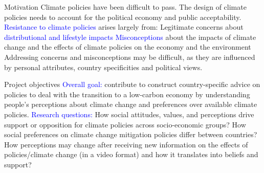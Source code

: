 








\begin{frame}{Motivation}
\bbs
\ip Climate policies have been difficult to pass.
\ip The design of climate policies needs to account for the political economy and public acceptability.
\ip \textcolor{blue}{Resistance to climate policies} arises largely from:
\bbs
\ip Legitimate concerns about \textcolor{blue}{distributional and lifestyle impacts}
\ip \textcolor{blue}{Misconceptions} about the impacts of climate change and the effects of climate policies on the economy and the environment
\ee 
\ip Addressing concerns and misconceptions may be difficult, as they are influenced by personal attributes, country specificities and political views.
\ee
\end{frame}

\begin{frame}{Project objectives}
\bbs
\ip \textcolor{blue}{Overall goal:} contribute to construct country-specific advice on policies to deal with the transition to a low-carbon economy by understanding people’s perceptions about climate change and preferences over available climate policies.
\ip \textcolor{blue}{Research questions:}
\bbs
\ip How social attitudes, values, and perceptions drive support or opposition for climate policies across socio-economic groups?
\ip How social preferences on climate change mitigation policies differ between countries?
\ip How perceptions may change after receiving new information on the effects of policies/climate change (in a video format) and how it translates into beliefs and support?
\ee
\ee
\end{frame}

